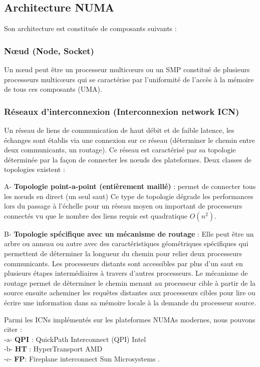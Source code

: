\subsection{Architecture NUMA}
Son architecture est constituée de composants suivants : 
%
\subsubsection{Nœud (Node, Socket)}
Un nœud peut être un processeur multicœurs ou un SMP constitué de plusieurs processeurs multicœurs qui se caractérise par l'uniformité de l'accès à la mémoire de tous ces composants (UMA).
%
\subsubsection{Réseaux d'interconnexion (Interconnexion network ICN)}
Un réseau de liens de communication de haut débit et de faible latence, les échanges sont établis via une connexion sur ce réseau (déterminer le chemin entre deux communicants, un routage). %
Ce réseau est caractérisé par sa topologie déterminée par la façon de connecter les nœuds des plateformes. Deux classes de topologies existent :

A- \textbf{Topologie point-a-point (entièrement maillé)} : permet de connecter tous les nœuds en direct (un seul saut) 
Ce type de topologie dégrade les performances lors du passage à l'échelle pour un réseau moyen ou important de processeurs connectés vu que le nombre des liens requis est quadratique $O(n^2)$.

B- \textbf{Topologie spécifique avec un mécanisme de routage} : Elle peut être un arbre ou anneau ou autre avec des caractéristiques géométriques spécifiques qui permettent de déterminer la longueur du chemin pour relier deux processeurs communicants. 
Les processeurs distants sont accessibles par plus d'un saut en plusieurs étapes intermédiaires à travers d’autres processeurs. 
Le mécanisme de routage permet de déterminer le chemin menant au processeur cible à partir de la source ensuite acheminer les requêtes distantes aux processeurs cibles pour lire ou écrire une information dans sa mémoire locale à la demande du processeur source. 

Parmi les ICNs implémentés sur les plateformes NUMAs modernes, nous pouvons citer \cite{dan-mul} : \\
-a- \textbf{QPI} : QuickPath Interconnect (QPI) Intel \cite{IntelQPI09}\\
-b- \textbf{HT} : HyperTransport AMD \cite{amdHT}\\
-c- \textbf{FP}: Fireplane interconnect Sun Microsystems \cite{Char02}.
%
